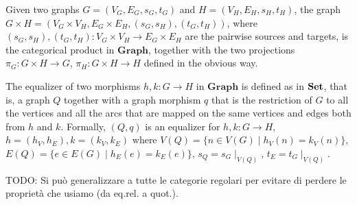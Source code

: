 \begin{example}
    Given two graphs $G = (V_G, E_G, s_G, t_G)$ and $H=(V_H, E_H, s_H, t_H)$, the graph $G \times H = (V_G\times V_H, E_G \times E_H, (s_G, s_H), (t_G, t_H))$, where $(s_G, s_H), (t_G, t_H):V_G\times V_H \rightarrow E_G \times E_H$ are the pairwise sources and targets, is the categorical product in $\mathbf{Graph}$, together with the two projections $\pi_G: G \times H \rightarrow G$, $\pi_H : G \times H \rightarrow H$ defined in the obvious way.
\end{example}

\begin{example}
    The equalizer of two morphisms $h, k: G \rightarrow H$ in $\mathbf{Graph}$ is defined as in $\mathbf{Set}$, that is,  a graph $Q$ together with a graph morphism $q$ that is the restriction of $G$ to all the vertices and all the arcs that are mapped on the same vertices and edges both from $h$ and $k$. Formally, $(Q, q)$ is an equalizer for $h, k: G \rightarrow H$, $h = (h_V, h_E), k = (k_V, k_E)$ where $V(Q) = \{ n \in V(G) \mid h_V(n) = k_V(n)\}$, $E(Q) = \{ e \in E(G) \mid h_E(e) = k_E(e)\}$, $s_Q = s_G \mid_{V(Q)}$, $t_E = t_G \mid_{V(Q)}$.
\end{example}

\begin{remark}
    TODO: Si può generalizzare a tutte le categorie regolari per evitare di perdere le proprietà che usiamo (da eq.rel. a quot.).
\end{remark}
